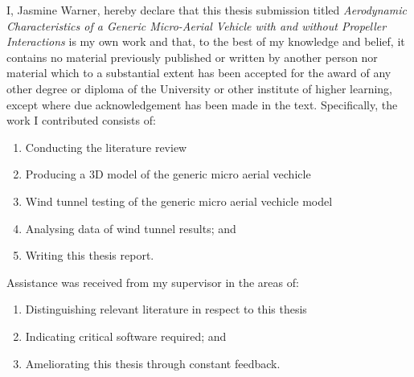 
\begin{declaration}
\vspace{-3em}
I, Jasmine Warner, hereby declare that this thesis submission titled \emph{Aerodynamic Characteristics of a Generic Micro-Aerial Vehicle with and without Propeller Interactions} is my own work and that, to the best of my knowledge and belief, it contains no material previously published or written by another person nor material which to a substantial extent has been accepted for the award of any other degree or diploma of the University or other institute of higher learning, except where due acknowledgement has been made in the text.  Specifically, the work I contributed consists of:

\vspace{-1em}

\begin{enumerate}
    \item Conducting the literature review
    \item Producing a 3D model of the generic micro aerial vechicle
    \item Wind tunnel testing of the generic micro aerial vechicle model
    \item Analysing data of wind tunnel results; and
    \item Writing this thesis report.
\end{enumerate}

\vspace{-1em}

Assistance was received from my supervisor in the areas of:

\vspace{-1em}

\begin{enumerate}
    \item Distinguishing relevant literature in respect to this thesis
    \item Indicating critical software required; and
    \item Ameliorating this thesis through constant feedback.
\end{enumerate}

\vspace{0.5cm}


\end{declaration}
